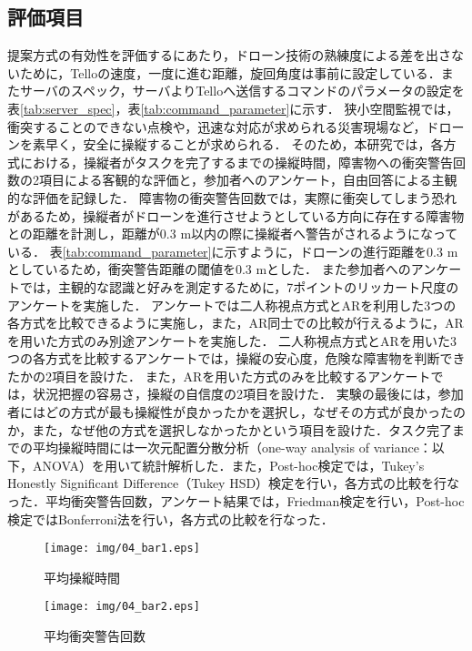 \documentclass[submit]{ipsj}
\begin{document}
\subsection{評価項目}
提案方式の有効性を評価するにあたり，ドローン技術の熟練度による差を出さないために，Telloの速度，一度に進む距離，旋回角度は事前に設定している．またサーバのスペック，サーバよりTelloへ送信するコマンドのパラメータの設定を表\ref{tab:server_spec}，表\ref{tab:command_parameter}に示す．
狭小空間監視では，衝突することのできない点検や，迅速な対応が求められる災害現場など，ドローンを素早く，安全に操縦することが求められる\cite{article-drone02}．
そのため，本研究では，各方式における，操縦者がタスクを完了するまでの操縦時間，障害物への衝突警告回数の2項目による客観的な評価と，参加者へのアンケート，自由回答による主観的な評価を記録した．
障害物の衝突警告回数では，実際に衝突してしまう恐れがあるため，操縦者がドローンを進行させようとしている方向に存在する障害物との距離を計測し，距離が0.3 m以内の際に操縦者へ警告がされるようになっている．
表\ref{tab:command_parameter}に示すように，ドローンの進行距離を0.3 mとしているため，衝突警告距離の閾値を0.3 mとした．
また参加者へのアンケートでは，主観的な認識と好みを測定するために，7ポイントのリッカート尺度のアンケートを実施した．
アンケートでは二人称視点方式とARを利用した3つの各方式を比較できるように実施し，また，AR同士での比較が行えるように，ARを用いた方式のみ別途アンケートを実施した．
二人称視点方式とARを用いた3つの各方式を比較するアンケートでは，操縦の安心度，危険な障害物を判断できたかの2項目を設けた．
また，ARを用いた方式のみを比較するアンケートでは，状況把握の容易さ，操縦の自信度の2項目を設けた．
実験の最後には，参加者にはどの方式が最も操縦性が良かったかを選択し，なぜその方式が良かったのか，また，なぜ他の方式を選択しなかったかという項目を設けた．タスク完了までの平均操縦時間には一次元配置分散分析（one-way analysis of variance：以下，ANOVA）を用いて統計解析した．また，Post-hoc検定では，Tukey’s Honestly Significant Difference（Tukey HSD）検定を行い，各方式の比較を行なった．平均衝突警告回数，アンケート結果では，Friedman検定を行い，Post-hoc検定ではBonferroni法を行い，各方式の比較を行なった．


\begin{figure}[tb]
\centering
\texttt{[image: img/04\_bar1.eps]}
\caption{平均操縦時間}
\label{fig:04_bar1}
\end{figure}

\begin{figure}[tb]
\centering
\texttt{[image: img/04\_bar2.eps]}
\caption{平均衝突警告回数}
\label{fig:04_bar2}
\end{figure}
\end{document}
